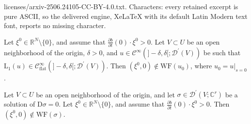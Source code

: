 \documentclass[10pt,a4paper]{amsart}
\begin{document}
licenses/arxiv-2506.24105-CC-BY-4.0.txt. Characters: every retained excerpt is pure ASCII, so the delivered engine, XeLaTeX with its default Latin Modern text font, reports no missing character.
\begin{thm}\label{thm:microlocal_approximate_solution}
	Let $\xi^0 \in \mathbb{R}^N \setminus \{ 0 \}$, and assume that $\frac{\partial b}{\partial t}(0) \cdot \xi^0 > 0$. Let $V\subset U$ be an open neighborhood of the origin, $\delta>0$, and $u \in \mathcal{C}^\infty(]-\delta, \delta[; \mathcal{D}^\prime(V))$ be such that $\mathrm{L}_1(u) \in \mathcal{C}_\text{flat}^\infty(]-\delta, \delta[; \mathcal{D}^\prime(V))$. Then $(\xi^0, 0) \notin \mathrm{WF} (u_0)$, where $u_0 = u|_{s=0}$.
\end{thm}

\begin{thm}\label{thm:microlocal_nonhomogeneous_system}
	Let $V\subset U$ be an open neighborhood of the origin, and let $\sigma \in \mathcal{D}^\prime(V; \mathbb{C}^r)$ be a solution of $\mathrm{D}\sigma = 0$. Let $\xi^0 \in \mathbb{R}^N \setminus \{ 0 \}$, and assume that $\frac{\partial b}{\partial t}(0) \cdot \xi^0 > 0$. Then $(\xi^0, 0) \notin \mathrm{WF} (\sigma)$.
\end{thm}
\end{document}
